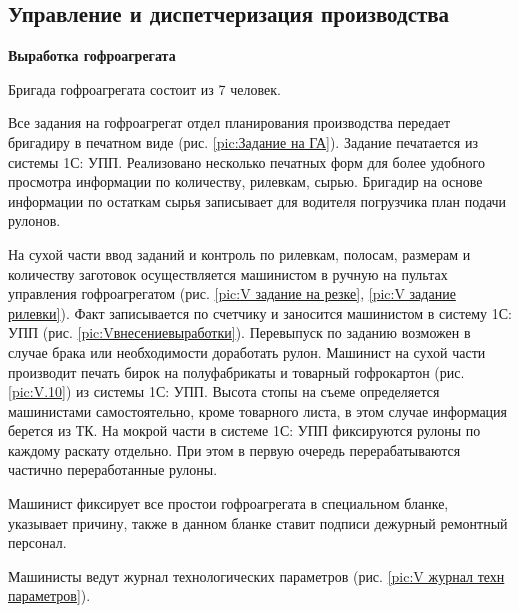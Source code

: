 \clearpage


\newpage
\subsection{Управление и диспетчеризация производства}
\label{bp:production}





\textbf{Выработка гофроагрегата}

Бригада гофроагрегата состоит из 7 человек.

Все задания на гофроагрегат отдел планирования производства передает бригадиру в печатном виде (рис. \ref{pic:Задание на ГА}). Задание печатается из системы 1С: УПП. Реализовано несколько печатных форм для более удобного просмотра информации по количеству, рилевкам, сырью. Бригадир на основе информации по остаткам сырья записывает для водителя погрузчика план подачи рулонов. 

На сухой части ввод заданий и контроль по рилевкам, полосам, размерам и количеству заготовок осуществляется машинистом в ручную на пультах управления гофроагрегатом (рис. \ref{pic:V задание на резке}, \ref{pic:V задание рилевки}). Факт записывается по счетчику и заносится машинистом в систему 1С: УПП (рис. \ref{pic:Vвнесениевыработки}). Перевыпуск по заданию возможен в случае брака или необходимости доработать рулон. Машинист на сухой части производит печать бирок на полуфабрикаты и товарный гофрокартон (рис. \ref{pic:V.10}) из системы 1С: УПП. Высота стопы на съеме определяется машинистами самостоятельно, кроме товарного листа, в этом случае информация берется из ТК.
На мокрой части в системе 1С: УПП фиксируются рулоны по каждому раскату отдельно. При этом в первую очередь перерабатываются частично переработанные рулоны.

Машинист фиксирует все простои гофроагрегата в специальном бланке, указывает причину, также в данном бланке ставит подписи дежурный ремонтный персонал. 

Машинисты ведут журнал технологических параметров (рис. \ref{pic:V журнал техн параметров}). 

